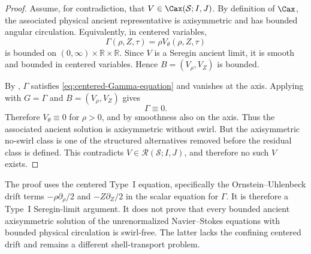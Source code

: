 \begin{proof}
Assume, for contradiction, that
\(V\in\Cax(\mathcal S;I,J)\).  By definition of \(\Cax\), the
associated physical ancient representative is axisymmetric and has bounded
angular circulation.  Equivalently, in centered variables,
\[
   \Gamma(\rho,Z,\tau)=\rho V_\theta(\rho,Z,\tau)
\]
is bounded on \((0,\infty)\times\mathbb R\times\mathbb R\).  Since \(V\) is a
Seregin ancient limit, it is smooth and bounded in centered variables.  Hence
\(B=(V_\rho,V_Z)\) is bounded.

By , \(\Gamma\) satisfies
\eqref{eq:centered-Gamma-equation} and vanishes at the axis.  Applying
 with \(G=\Gamma\) and
\(B=(V_\rho,V_Z)\) gives
\[
   \Gamma\equiv0 .
\]
Therefore \(V_\theta\equiv0\) for \(\rho>0\), and by smoothness also on the
axis.  Thus the associated ancient solution is axisymmetric without swirl.
But the axisymmetric no-swirl class is one of the structured alternatives
removed before the residual class is defined.  This contradicts
\(V\in\mathcal R(\mathcal S;I,J)\), and therefore no such \(V\) exists.
\end{proof}

\begin{remark}
The proof uses the centered Type~I equation, specifically the
Ornstein--Uhlenbeck drift terms \(-\rho\partial_\rho/2\) and
\(-Z\partial_Z/2\) in the scalar equation for \(\Gamma\).  It is therefore a
Type~I Seregin-limit argument.  It does not prove that every bounded ancient
axisymmetric solution of the unrenormalized Navier--Stokes equations with
bounded physical circulation is swirl-free.  The latter lacks the confining
centered drift and remains a different shell-transport problem.
\end{remark}
